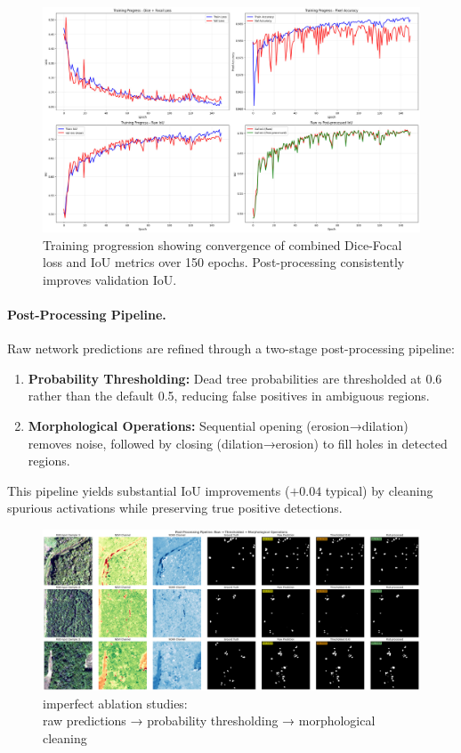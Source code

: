 \begin{figure}
  \centering
  \includegraphics[width=.9\linewidth]{figs/unet-train-curve.jpg}
  \caption{Training progression showing convergence of combined Dice-Focal loss and IoU metrics over 150 epochs. Post-processing consistently improves validation IoU.}
  \label{fig:training_curves}
\end{figure}

\paragraph{Post-Processing Pipeline.}
Raw network predictions are refined through a two-stage post-processing pipeline:

\begin{enumerate}
\item \textbf{Probability Thresholding:} Dead tree probabilities are thresholded at 0.6 rather than the default 0.5, reducing false positives in ambiguous regions.
\item \textbf{Morphological Operations:} Sequential opening (erosion→dilation) removes noise, followed by closing (dilation→erosion) to fill holes in detected regions.
\end{enumerate}

This pipeline yields substantial IoU improvements ($+0.04$ typical) by cleaning spurious activations while preserving true positive detections.

\begin{figure}
  \centering
  \includegraphics[width=.9\linewidth]{figs/unet-pipeline-compared.jpg}
  \caption{imperfect ablation studies:\\ raw predictions → probability thresholding → morphological cleaning}
  \label{fig:postprocessing}
\end{figure}

